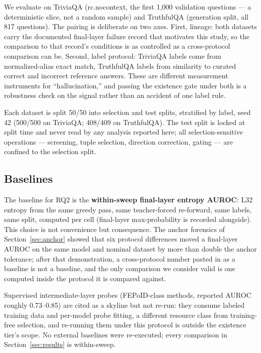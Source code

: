We evaluate on TriviaQA (rc.nocontext, the first 1,000 validation questions --- a deterministic slice, not a random sample) and TruthfulQA (generation split, all 817 questions). The pairing is deliberate on two axes. First, lineage: both datasets carry the documented final-layer failure record that motivates this study, so the comparison to that record's conditions is as controlled as a cross-protocol comparison can be. Second, label protocol: TriviaQA labels come from normalized-alias exact match, TruthfulQA labels from similarity to curated correct and incorrect reference answers. These are different measurement instruments for ``hallucination,'' and passing the existence gate under both is a robustness check on the signal rather than an accident of one label rule.

Each dataset is split 50/50 into selection and test splits, stratified by label, seed 42 (500/500 on TriviaQA; 408/409 on TruthfulQA). The test split is locked at split time and never read by any analysis reported here; all selection-sensitive operations --- screening, tuple selection, direction correction, gating --- are confined to the selection split.

\subsection{Baselines}
\label{sec:baselines}

The baseline for RQ2 is the \textbf{within-sweep final-layer entropy AUROC}: L32 entropy from the same greedy pass, same teacher-forced re-forward, same labels, same split, computed per cell (final-layer max-probability is recorded alongside). This choice is not convenience but consequence. The anchor forensics of Section~\ref{sec:anchor} showed that six protocol differences moved a final-layer AUROC on the same model and nominal dataset by more than double the anchor tolerance; after that demonstration, a cross-protocol number pasted in as a baseline is not a baseline, and the only comparison we consider valid is one computed inside the protocol it is compared against.

Supervised intermediate-layer probes (FEPoID-class methods, reported AUROC roughly 0.73--0.85) are cited as a skyline but not re-run: they consume labeled training data and per-model probe fitting, a different resource class from training-free selection, and re-running them under this protocol is outside the existence tier's scope. No external baselines were re-executed; every comparison in Section~\ref{sec:results} is within-sweep.

